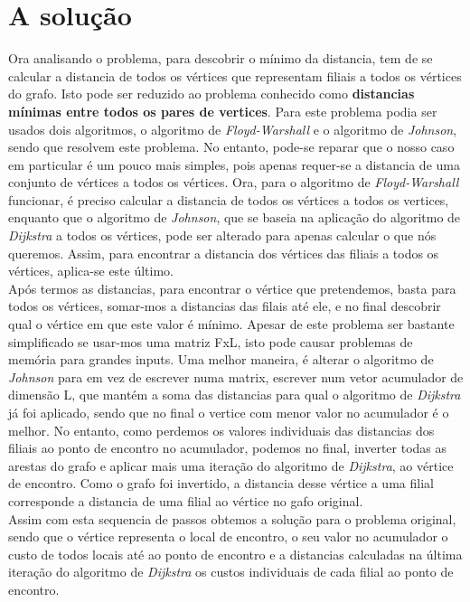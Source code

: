 \documentclass[12pt]{article}
\begin{document}
\section{A solução}
Ora analisando o problema, para descobrir o mínimo da distancia, tem de se calcular a distancia de todos os vértices que representam filiais a todos os vértices do grafo. Isto pode ser reduzido ao problema conhecido como \textbf{distancias mínimas entre todos os pares de vertices}. Para este problema podia ser usados dois algoritmos, o algoritmo de \textit{Floyd-Warshall} e o algoritmo de \textit{Johnson}, sendo que resolvem este problema. No entanto, pode-se reparar que o nosso caso em particular é um pouco mais simples, pois apenas requer-se a distancia de uma conjunto de vértices a todos os vértices. Ora, para o algoritmo de \textit{Floyd-Warshall} funcionar, é preciso calcular a distancia de todos os vértices a todos os vertices, enquanto que o algoritmo de \textit{Johnson}, que se baseia na aplicação do algoritmo de \textit{Dijkstra} a todos os vértices, pode ser alterado para apenas calcular o que nós queremos. Assim, para encontrar a distancia dos vértices das filiais a todos os vértices, aplica-se este último.\\
Após termos as distancias, para encontrar o vértice que pretendemos, basta para todos os vértices, somar-mos a distancias das filais até ele, e no final descobrir qual o vértice em que este valor é mínimo. Apesar de este problema ser bastante simplificado se usar-mos uma matriz FxL, isto pode causar problemas de memória para grandes inputs. Uma melhor maneira, é alterar o algoritmo de \textit{Johnson} para em vez de escrever numa matrix, escrever num vetor acumulador de dimensão L, que mantém a soma das distancias para qual o algoritmo de \textit{Dijkstra} já foi aplicado, sendo que no final o vertice com menor valor no acumulador é o melhor. No entanto, como perdemos os valores individuais das distancias dos filiais ao ponto de encontro no acumulador, podemos no final, inverter todas as arestas do grafo e aplicar mais uma iteração do algoritmo de \textit{Dijkstra}, ao vértice de encontro. Como o grafo foi invertido, a distancia desse vértice a uma filial corresponde a distancia de uma filial ao vértice no gafo original. \\
\indent Assim com esta sequencia de passos obtemos a solução para o problema original, sendo que o vértice representa o local de encontro, o seu valor no acumulador o custo de todos locais até ao ponto de encontro e a distancias calculadas na última iteração do algoritmo de \textit{Dijkstra} os custos individuais de cada filial ao ponto de encontro.
\end{document}
